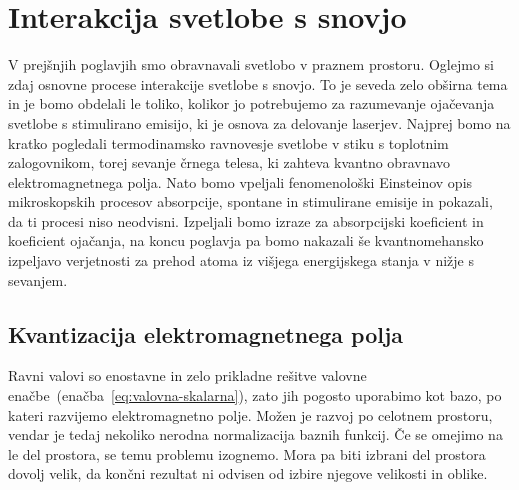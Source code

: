 \chapter{Interakcija svetlobe s snovjo}

V prejšnjih poglavjih smo obravnavali svetlobo v praznem prostoru. Oglejmo si
zdaj osnovne procese interakcije svetlobe s snovjo. To je seveda zelo
obširna tema in je bomo obdelali le toliko, kolikor jo potrebujemo za
razumevanje ojačevanja svetlobe s stimulirano emisijo, ki je osnova za
delovanje laserjev. Najprej bomo na kratko pogledali termodinamsko ravnovesje 
svetlobe v stiku s toplotnim zalogovnikom, torej sevanje črnega telesa, ki 
zahteva kvantno obravnavo elektromagnetnega polja. Nato bomo vpeljali fenomenološki
Einsteinov opis mikroskopskih procesov absorpcije, spontane in stimulirane
emisije in pokazali, da ti procesi niso neodvisni. Izpeljali bomo
izraze za absorpcijski koeficient in koeficient ojačanja, na koncu poglavja
pa bomo nakazali še kvantnomehansko izpeljavo verjetnosti za prehod
atoma iz višjega energijskega stanja v nižje s sevanjem.

\section{Kvantizacija elektromagnetnega polja}
Ravni valovi so enostavne in zelo prikladne rešitve valovne 
enačbe~(enačba~\ref{eq:valovna-skalarna}), zato jih pogosto uporabimo kot 
bazo, po kateri razvijemo elektromagnetno polje. Možen je razvoj
po celotnem prostoru, vendar je tedaj nekoliko nerodna normalizacija baznih
funkcij. Če se omejimo na le del prostora, se temu problemu izognemo. Mora pa biti 
izbrani del prostora dovolj velik, da končni rezultat ni odvisen od izbire 
njegove velikosti in oblike.

